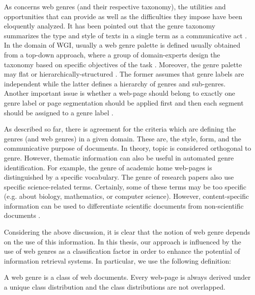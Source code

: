 As concerns web genres (and their respective taxonomy), the utilities and opportunities that can provide as well as the difficulties they impose have been eloquently analyzed. It has been pointed out that the genre taxonomy summarizes the type and style of texts in a single term as a communicative act \parencite{de2009genre}. In the domain of WGI, usually a web genre palette is defined usually obtained from a top-down approach, where a group of domain-experts design the taxonomy based on specific objectives of the task \parencite{crowston2011problems}. Moreover, the genre palette may flat or hierarchically-structured \parencite{wu2010fine}. The former assumes that genre labels are independent while the latter defines a hierarchy of genres and sub-genres. Another important issue is whether a web-page should belong to exactly one genre label or page segmentation should be applied first and then each segment should be assigned to a genre label  \parencite{madjarov2015web,jebari2015combination}. 

As described so far, there is agreement for the criteria which are defining the genres (and web genres) in a given domain. These are, the style, form, and the communicative purpose of documents. In theory, topic is considered orthogonal to genre. However, thematic information can also be useful in automated genre identification. For example, the genre of academic home web-pages is distinguished by a specific vocabulary. The genre of research papers also use specific science-related terms. Certainly, some of these terms may be too specific (e.g. about biology, mathematics, or computer science). However, content-specific information can be used to differentiate scientific documents from non-scientific documents \parencite{coutinho2009describe,crowston2011problems,kanaris2009learning,jebari2015combination,gollapalli2011identifying}. 

Considering the above discussion, it is clear that the notion of web genre depends on the use of this information. In this thesis, our approach is influenced by the use of web genres as a classification factor in order to enhance the potential of information retrieval systems. In particular, we use the following definition:

\begin{definition} A web genre is a class of web documents. Every web-page is always derived under a unique class distribution and the class distributions are not overlapped.
\end{definition}

